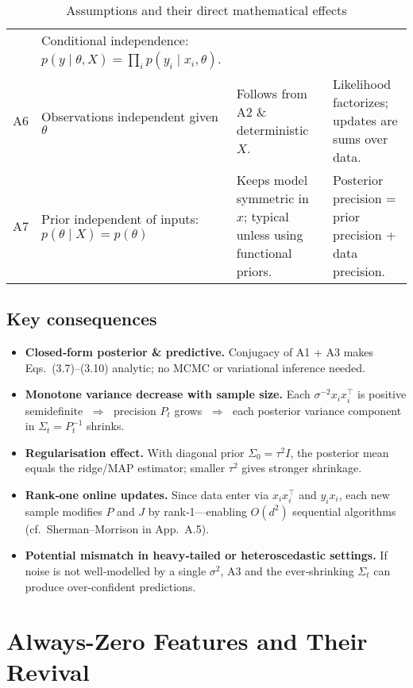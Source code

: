 \documentclass[11pt]{article}
\begin{document}
\begin{table}[ht]
\begin{tabularx}{\textwidth}{l X X X}
         & Conditional independence: \(p(y\mid\theta,X)=\prod_i p(y_i\mid x_i,\theta)\).               \\
    A6   & Observations independent given \(\theta\)             
         & Follows from A2 \& deterministic \(X\).                                 
         & Likelihood factorizes; updates are sums over data.                                       \\
    A7   & Prior independent of inputs: \(p(\theta\mid X)=p(\theta)\) 
         & Keeps model symmetric in \(x\); typical unless using functional priors. 
         & Posterior precision = prior precision + data precision.                                  \\
    \bottomrule
  \end{tabularx}
  \caption{Assumptions and their direct mathematical effects}
  \label{tab:assumptions}
\end{table}


\subsection*{Key consequences}
\begin{itemize}
  \item \textbf{Closed‐form posterior \& predictive.}  
        Conjugacy of A1 + A3 makes Eqs.~(3.7)--(3.10) analytic; no MCMC or variational inference needed.
  \item \textbf{Monotone variance decrease with sample size.}  
        Each $\sigma^{-2}x_i x_i^\top$ is positive semidefinite $\;\Rightarrow\;$ precision $P_t$ grows $\;\Rightarrow\;$ each posterior variance component in $\Sigma_t=P_t^{-1}$ shrinks.
  \item \textbf{Regularisation effect.}  
        With diagonal prior $\Sigma_0=\tau^2 I$, the posterior mean equals the ridge/MAP estimator; smaller $\tau^2$ gives stronger shrinkage.
  \item \textbf{Rank‐one online updates.}  
        Since data enter via $x_i x_i^\top$ and $y_i x_i$, each new sample modifies $P$ and $J$ by rank‐1—enabling $O(d^2)$ sequential algorithms (cf.\ Sherman–Morrison in App.~A.5).
  \item \textbf{Potential mismatch in heavy‐tailed or heteroscedastic settings.}  
        If noise is not well‐modelled by a single $\sigma^2$, A3 and the ever‐shrinking $\Sigma_t$ can produce over-confident predictions.
\end{itemize}

\section{Always-Zero Features and Their Revival}
\end{document}
